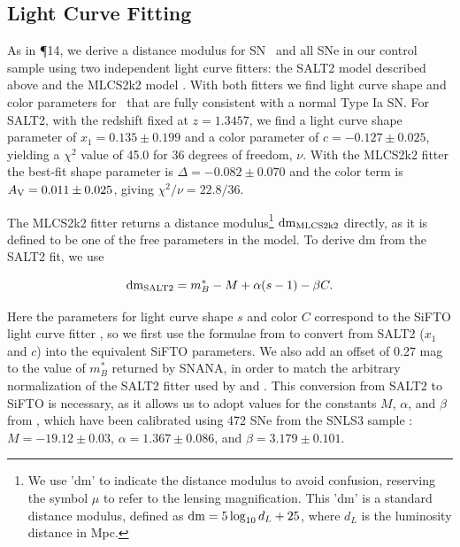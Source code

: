 \subsection{Light Curve Fitting}
\label{sec:LightCurveFitting}


As in \P14, we derive a distance modulus for
SN \tomas\ and all SNe in our control sample using two independent
light curve fitters: the SALT2 model described above and the MLCS2k2
model \citep{Jha:2007}.    With both fitters we find light curve
shape and color parameters for \tomas\ that are fully consistent with
a normal Type Ia SN.  For SALT2, with the
redshift fixed at $z=1.3457$, we find a light curve shape
parameter of $x_1=0.135\pm0.199$ and a color parameter of
$c=-0.127\pm0.025$, yielding a $\chi^2$ value of 45.0 for 36 degrees
of freedom, $\nu$.  With the MLCS2k2 fitter the best-fit shape
parameter is $\Delta=-0.082\pm0.070$ and the color term is
$A_{\rm V}=0.011\pm0.025$, giving $\chi^2/\nu=22.8/36$.


 The MLCS2k2 fitter returns a distance
modulus\footnote{We use 'dm' to indicate the distance modulus to avoid
confusion, reserving the symbol $\mu$ to refer to the lensing
magnification. This 'dm' is a standard distance modulus, defined as
${\rm dm}=5\log_{10}d_L+25$, where $d_L$ is the luminosity distance in
Mpc.}  $\rm{dm}_{\rm MLCS2k2}$ directly, as it is defined to be one of
the free parameters in the model. To derive dm from the SALT2 fit, we
use

\begin{equation} \label{eqn:dmSALT2}
 {\rm dm}_{\rm SALT2} = m_B^* - M + \alpha(s-1) - \beta C.
\end{equation}

\noindent  Here the parameters for light curve shape $s$ and color $C$ 
correspond to the SiFTO light curve fitter \citep{Conley:2008}, so we
first use the formulae from \citet{Guy:2010} to convert from SALT2
($x_1$ and $c$) into the equivalent SiFTO parameters.  We also add an
offset of 0.27 mag to the value of $m_B^*$ returned by SNANA, in order
to match the arbitrary normalization of the SALT2 fitter used
by \citet{Guy:2010} and \citet{Sullivan:2011}. This conversion from SALT2 to SiFTO is necessary, as it allows
us to adopt values for the constants $M$, $\alpha$, and $\beta$
from \citet{Sullivan:2011}, which have been calibrated using 472 SNe
from the SNLS3 sample \citep{Conley:2011}: $M=-19.12\pm0.03$,
$\alpha=1.367\pm0.086$, and $\beta=3.179\pm0.101$.



